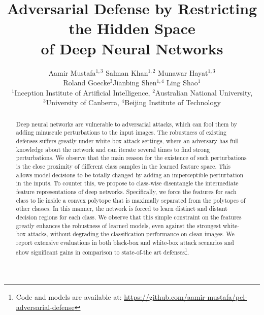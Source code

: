 \documentclass[10pt,twocolumn,letterpaper]{article}
\begin{document}
\title{\vspace{-1cm} Adversarial Defense by Restricting the Hidden Space\\ of Deep Neural Networks}

\vspace{-1cm}
\author{Aamir Mustafa$^{1,3}$ \qquad Salman Khan$^{1,2}$ \qquad Munawar Hayat$^{1,3}$ \\
Roland Goecke$^{3}$\qquad Jianbing Shen$^{1,4}$ \qquad Ling Shao$^{1}$\\
$^1$Inception Institute of Artificial Intelligence, $^2$Australian National University,\\
$^3$University of Canberra, $^4$Beijing Institute of Technology\\
}

\maketitle



\begin{abstract}
Deep neural networks are vulnerable to adversarial attacks, which can fool them by adding minuscule perturbations to the input images. The robustness of existing defenses suffers greatly under white-box attack settings, where an adversary has full knowledge about the network and can iterate several times to find strong perturbations. We observe that the main reason for the existence of such perturbations is the close proximity of different class samples in the learned feature space. This allows model decisions to be totally changed by adding an imperceptible perturbation in the inputs. To counter this, we propose to class-wise disentangle the intermediate feature representations of deep networks. Specifically, we force the features for each class to lie inside a convex polytope that is maximally separated from the polytopes of other classes. In this manner, the network is forced to learn distinct and distant decision regions for each class. We observe that this simple constraint on the features greatly enhances the robustness of learned models, even against the strongest white-box attacks, without degrading the classification performance on clean images. We report extensive evaluations in both black-box and white-box attack scenarios and show significant gains in comparison to state-of-the art defenses\footnote{Code and models are available at: \url{https://github.com/aamir-mustafa/pcl-adversarial-defense}}. 
\end{abstract}
\end{document}
